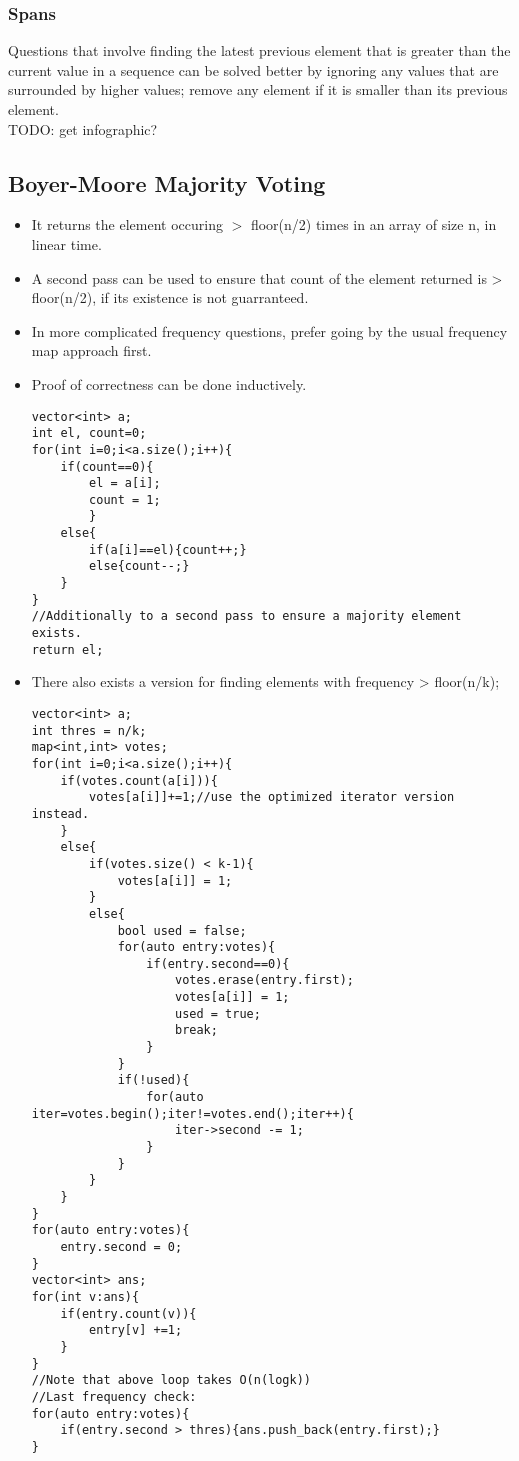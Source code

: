 \documentclass{article}
\begin{document}
\subsubsection{Spans}
Questions that involve finding the latest previous element that is greater than the 
current value in a sequence can be solved better by ignoring any values that are
surrounded by higher values; remove any element if it is smaller than its previous
element.\\
TODO: get infographic?


\subsection{Boyer-Moore Majority Voting}
\begin{itemize}
\item It returns the element occuring $>$ floor(n/2) times in an array of size n, in linear time.
\item A second pass can be used to ensure that count of the element returned is > floor(n/2), if its existence is not guarranteed.
\item In more complicated frequency questions, prefer going by the usual frequency map approach first.
\item Proof of correctness can be done inductively.
\begin{lstlisting}
vector<int> a;
int el, count=0;
for(int i=0;i<a.size();i++){
    if(count==0){
        el = a[i];
        count = 1;
        }
    else{
        if(a[i]==el){count++;}
        else{count--;}
    }
}
//Additionally to a second pass to ensure a majority element exists.
return el;
\end{lstlisting}
\item There also exists a version for finding elements with frequency > floor(n/k);
\begin{lstlisting}
vector<int> a;
int thres = n/k;
map<int,int> votes;
for(int i=0;i<a.size();i++){
    if(votes.count(a[i])){
        votes[a[i]]+=1;//use the optimized iterator version instead.
    }
    else{
        if(votes.size() < k-1){
            votes[a[i]] = 1;
        }
        else{
            bool used = false;
            for(auto entry:votes){
                if(entry.second==0){
                    votes.erase(entry.first);
                    votes[a[i]] = 1;
                    used = true;
                    break;
                }
            }
            if(!used){
                for(auto iter=votes.begin();iter!=votes.end();iter++){
                    iter->second -= 1;
                }
            }
        }
    }
}
for(auto entry:votes){
    entry.second = 0;
}
vector<int> ans;
for(int v:ans){
    if(entry.count(v)){
        entry[v] +=1;
    }
}
//Note that above loop takes O(n(logk))
//Last frequency check:
for(auto entry:votes){
    if(entry.second > thres){ans.push_back(entry.first);}
}
\end{lstlisting} 
\end{itemize}
\end{document}
